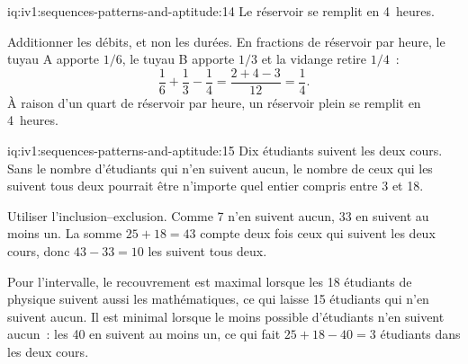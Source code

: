 \begin{solution}{iq:iv1:sequences-patterns-and-aptitude:14}
Le réservoir se remplit en 4~heures.

Additionner les débits, et non les durées. En fractions de réservoir par heure, le tuyau A apporte $1/6$, le tuyau B apporte $1/3$ et la vidange retire $1/4$~:
\[
\frac16 + \frac13 - \frac14 = \frac{2 + 4 - 3}{12} = \frac14.
\]
À raison d'un quart de réservoir par heure, un réservoir plein se remplit en 4~heures.

\end{solution}

\begin{solution}{iq:iv1:sequences-patterns-and-aptitude:15}
Dix étudiants suivent les deux cours. Sans le nombre d'étudiants qui n'en suivent aucun, le nombre de ceux qui les suivent tous deux pourrait être n'importe quel entier compris entre 3 et 18.

Utiliser l'inclusion--exclusion. Comme 7 n'en suivent aucun, 33 en suivent au moins un. La somme $25 + 18 = 43$ compte deux fois ceux qui suivent les deux cours, donc $43 - 33 = 10$ les suivent tous deux.

Pour l'intervalle, le recouvrement est maximal lorsque les 18 étudiants de physique suivent aussi les mathématiques, ce qui laisse 15 étudiants qui n'en suivent aucun. Il est minimal lorsque le moins possible d'étudiants n'en suivent aucun~: les 40 en suivent au moins un, ce qui fait $25 + 18 - 40 = 3$ étudiants dans les deux cours.

\end{solution}


